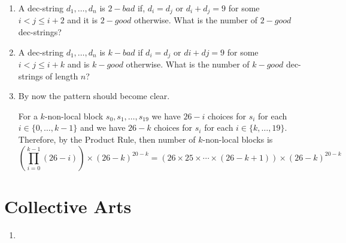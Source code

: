 \documentclass{article}
\begin{document}
\begin{enumerate}
   \item A dec-string $d_1,\ldots,d_n$ is $2-bad$ if, $d_i=d_j$ or $d_i+d_j=9$ for some $i<j \leq i+2$ and it is $2-good$ otherwise. What is the number of $2-good$ dec-strings?
   
   \item A dec-string $d_1,\ldots,d_n$ is $k-bad$ if $d_i=d_j$ or $di+dj=9$ for some $i<j \leq i+k$ and is $k-good$ otherwise. What is the number of $k-good$ dec-strings of length $n$?

  \item By now the pattern should become clear.  
  
  For a $k$-non-local block $s_0,s_1,\ldots,s_{19}$ we have $26-i$ choices for $s_i$ for each $i\in\{0,\ldots,k-1\}$ and we have $26-k$ choices for $s_i$ for each $i\in\{k,\ldots,19\}$.
  Therefore, by the Product Rule, then number of $k$-non-local blocks is 
  \[
     \left(\prod_{i=0}^{k-1}(26-i)\right)\times (26-k)^{20-k} =
     \left(26\times 25\times\cdots\times (26-k+1)\right)\times(26-k)^{20-k}
     \enspace
  \]
\end{enumerate}

\section{Collective Arts}

\begin{enumerate}

   \item

\end{enumerate}
\end{document}
